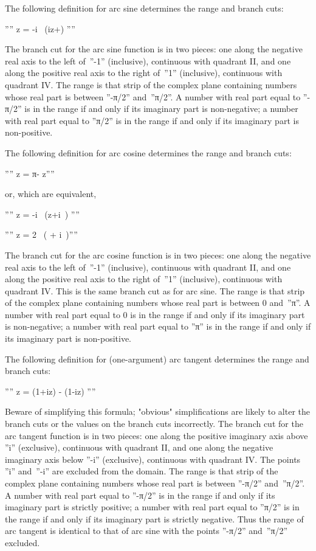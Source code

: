 The following definition for arc sine determines the range and branch cuts:

''''  z = -i\  \Bigl(iz+\Bigr) ''''

The branch cut for the arc sine function is in two pieces: one along the negative real axis to the left of~''-1'' (inclusive), continuous with quadrant II, and one along the positive real axis to the right of~''1'' (inclusive), continuous with quadrant IV. The range is that strip of the complex plane containing numbers whose real part is between ''-π/2'' and~''π/2''. A number with real part equal to ''-π/2'' is in the range if and only if its imaginary part is non-negative; a number with real part equal to ''π/2'' is in the range if and only if its imaginary part is non-positive.

The following definition for arc cosine determines the range and branch cuts:

''''  z = {π}-  z''''

or, which are equivalent,

''''  z = -i\  \Bigl(z+i\ \Bigr) ''''

''''  z = {{2\  \bigl( + i\ \bigr)}}''''

The branch cut for the arc cosine function is in two pieces: one along the negative real axis to the left of~''-1'' (inclusive), continuous with quadrant II, and one along the positive real axis to the right of~''1'' (inclusive), continuous with quadrant IV. This is the same branch cut as for arc sine. The range is that strip of the complex plane containing numbers whose real part is between 0 and~''π''. A number with real part equal to 0 is in the range if and only if its imaginary part is non-negative; a number with real part equal to ''π'' is in the range if and only if its imaginary part is non-positive.

The following definition for (one-argument) arc tangent determines the range and branch cuts:


''''  z = {{ (1+iz) -  (1-iz)}} ''''


Beware of simplifying this formula; "obvious" simplifications are likely to alter the branch cuts or the values on the branch cuts incorrectly. The branch cut for the arc tangent function is in two pieces: one along the positive imaginary axis above ''i'' (exclusive), continuous with quadrant II, and one along the negative imaginary axis below ''-i'' (exclusive), continuous with quadrant IV. The points ''i'' and~''-i'' are excluded from the domain. The range is that strip of the complex plane containing numbers whose real part is between ''-π/2'' and~''π/2''. A number with real part equal to ''-π/2'' is in the range if and only if its imaginary part is strictly positive; a number with real part equal to ''π/2'' is in the range if and only if its imaginary part is strictly negative. Thus the range of arc tangent is identical to that of arc sine with the points ''-π/2'' and~''π/2'' excluded.

